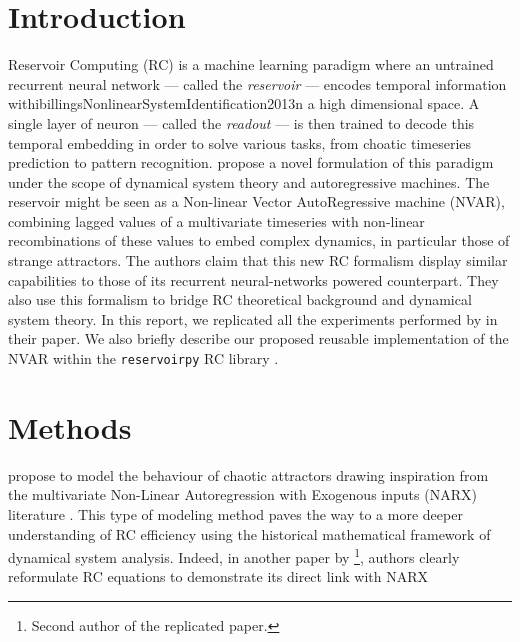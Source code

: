 
\section{Introduction}

Reservoir Computing (RC) is a machine learning paradigm where
an untrained recurrent neural network --- called the \textit{reservoir} --- encodes
temporal information withibillingsNonlinearSystemIdentification2013n a high dimensional space.
A single layer of neuron --- called the \textit{readout} ---
is then trained to decode this temporal embedding in order
to solve various tasks, from choatic timeseries prediction to pattern recognition.
\citet{gauthier2021next} propose a novel formulation of this paradigm under
the scope of dynamical system theory and autoregressive machines.
The reservoir might be seen as a Non-linear Vector AutoRegressive machine (NVAR),
combining lagged values of a multivariate timeseries
with non-linear recombinations of these values to embed complex dynamics,
in particular those of strange attractors.
The authors claim that this new RC formalism display similar capabilities to those
of its recurrent neural-networks powered counterpart. They also use this formalism
to bridge RC theoretical background and dynamical system theory\foot.
In this report, we replicated all the experiments performed by \citet{gauthier2021next}
in their paper. We also briefly describe our proposed reusable implementation
of the NVAR within the \texttt{reservoirpy} RC library \supercite{trouvain2020}.

\section{Methods}

\citet{gauthier2021next} propose to model the behaviour of chaotic attractors drawing inspiration
from the multivariate Non-Linear Autoregression with Exogenous inputs (NARX) literature \cite{billings2013}.
This type of modeling method paves the way to a more deeper understanding of RC efficiency using
the historical mathematical framework of dynamical system analysis. Indeed, in another paper by \citet{bollt2021}
\footnote{Second author of the replicated paper.}, authors clearly reformulate RC equations to demonstrate
its direct link with NARX 